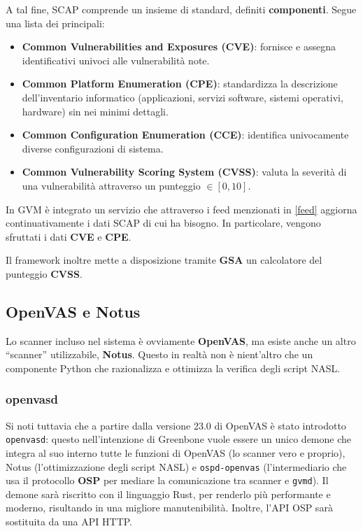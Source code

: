 A tal fine, SCAP comprende un insieme di standard, definiti \textbf{componenti}. Segue una lista dei principali:
\begin{itemize}
    \item \textbf{Common Vulnerabilities and Exposures (CVE)}: fornisce e assegna identificativi univoci alle vulnerabilità note.
    \item \textbf{Common Platform Enumeration (CPE)}: standardizza la descrizione dell'inventario informatico (applicazioni, servizi software, sistemi operativi, hardware) sin nei minimi dettagli.
    \item \textbf{Common Configuration Enumeration (CCE)}: identifica univocamente diverse configurazioni di sistema.
    \item \textbf{Common Vulnerability Scoring System (CVSS)}: valuta la severità di una vulnerabilità attraverso un punteggio $\in [0,10]$.
\end{itemize}

In GVM è integrato un servizio che attraverso i feed menzionati in \ref{feed} aggiorna continuativamente i dati SCAP di cui ha bisogno. In particolare, vengono sfruttati i dati \textbf{CVE} e \textbf{CPE}.

Il framework inoltre mette a disposizione tramite \textbf{GSA} un calcolatore del punteggio \textbf{CVSS}.

\subsection{OpenVAS e Notus}
Lo scanner incluso nel sistema è ovviamente \textbf{OpenVAS}, ma esiste anche un altro ``scanner'' utilizzabile, \textbf{Notus}. Questo in realtà non è nient'altro che un componente Python che razionalizza e ottimizza la verifica degli script NASL.

\subsubsection{openvasd}
Si noti tuttavia che a partire dalla versione 23.0 di OpenVAS è stato introdotto \texttt{openvasd}: questo nell'intenzione di Greenbone vuole essere un unico demone che integra al suo interno tutte le funzioni di OpenVAS (lo scanner vero e proprio), Notus (l'ottimizzazione degli script NASL) e \texttt{ospd-openvas} (l'intermediario che usa il protocollo \textbf{OSP} per mediare la comunicazione tra scanner e \texttt{gvmd}). Il demone sarà riscritto con il linguaggio Rust, per renderlo più performante e moderno, risultando in una migliore manutenibilità. Inoltre, l'API OSP sarà sostituita da una API HTTP.

